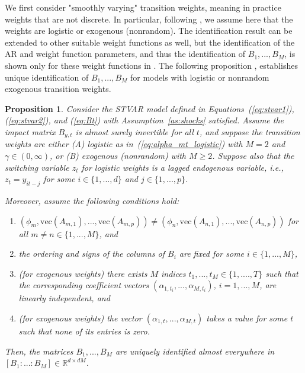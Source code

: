 \documentclass[nojss]{jss}
\newtheorem{proposition}{Proposition}
\begin{document}
We first consider "smoothly varying" transition weights, meaning in practice weights that are not discrete. In particular, following \cite{Virolainen2:2024}, we assume here that the weights are logistic or exogenous (nonrandom). The identification result can be extended to other suitable weight functions as well, but the identification of the AR and weight function parameters, and thus the identification of $B_1,...,B_M$, is shown only for these weight functions in \cite{Virolainen2:2024}. The following proposition \citep[similar to Proposition~1 of][but slightly edited here to include all the relevant conditions in one place]{Virolainen2:2024}, establishes unique identification of $B_1,...,B_M$ for models with logistic or nonrandom exogenous transition weights.
%
\begin{proposition}\label{prop:stvar_ident}
Consider the STVAR model defined in Equations~(\ref{eq:stvar1}), (\ref{eq:stvar2}), and (\ref{eq:Bt}) with Assumption~\ref{as:shocks} satisfied. Assume the impact matrix $B_{y,t}$ is almost surely invertible for all $t$, and suppose the transition weights are either (A) logistic as in~(\ref{eq:alpha_mt_logistic}) with $M=2$ and $\gamma\in(0,\infty)$, or (B) exogenous (nonrandom) with $M\geq 2$. Suppose also that the switching variable $z_t$ for logistic weights is a lagged endogenous variable, i.e., $z_t=y_{it-j}$ for some $i\in \lbrace 1,...,d \rbrace$ and $j\in \lbrace 1,...,p \rbrace$.

Moreover, assume the following conditions hold:
\begin{enumerate}%
\item $(\phi_{m},\text{vec}(A_{m,1}),...,\text{vec}(A_{m,p})) \neq (\phi_{n},\text{vec}(A_{n,1}),...,\text{vec}(A_{n,p}))$ for all $m\neq n \in \lbrace 1,...,M\rbrace$, and\label{cond:different_arpars}
\item the ordering and signs of the columns of $B_i$ are fixed for some $i\in\{1,...,M\}$, \label{cond:stvar_B_1}
\item (for exogenous weights) there exists $M$ indices $t_1,...,t_M\in\lbrace 1,....,T\rbrace$ such that the corresponding coefficient vectors $(\alpha_{1,t_i},...,\alpha_{M,t_i})$, $i=1,...,M$, are linearly independent, and\label{cond:linind}
\item (for exogenous weights) the vector $(\alpha_{1,t},...,\alpha_{M,t})$ takes a value for some $t$ such that none of its entries is zero.\label{cond:stvar_alpha}
\end{enumerate}
Then, the matrices $B_1,...,B_M$ are uniquely identified almost everywhere in $[B_1:...:B_M] \in\mathbb{R}^{d\times dM}$.
\end{proposition}
\end{document}
